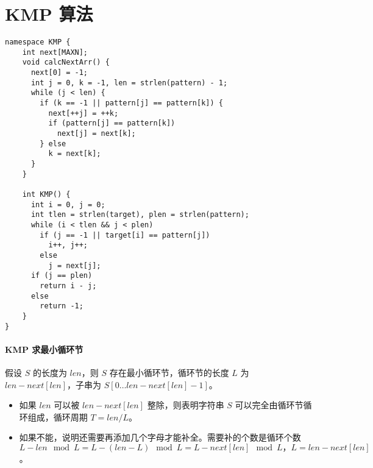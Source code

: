 \section{KMP 算法}
\begin{verbatim}
namespace KMP {
    int next[MAXN];
    void calcNextArr() {
      next[0] = -1;
      int j = 0, k = -1, len = strlen(pattern) - 1;
      while (j < len) {
        if (k == -1 || pattern[j] == pattern[k]) {
          next[++j] = ++k;
          if (pattern[j] == pattern[k])
            next[j] = next[k];
        } else
          k = next[k];
      }
    }

    int KMP() {
      int i = 0, j = 0;
      int tlen = strlen(target), plen = strlen(pattern);
      while (i < tlen && j < plen)
        if (j == -1 || target[i] == pattern[j])
          i++, j++;
        else
          j = next[j];  
      if (j == plen)
        return i - j;
      else
        return -1;
    }
}
\end{verbatim}

\paragraph{KMP 求最小循环节} 假设 $S$ 的长度为 $len$，则 $S$ 存在最小循环节，循环节的长度 $L$ 为 $len-next[len]$，子串为 $S[0…len-next[len]-1]$。
\begin{itemize}
  \item 如果 $len$ 可以被 $len - next[len]$ 整除，则表明字符串 $S$ 可以完全由循环节循环组成，循环周期 $T=len/L$。
  \item 如果不能，说明还需要再添加几个字母才能补全。需要补的个数是循环个数 $L-len \mod L=L-(len-L) \mod L=L-next[len] \mod L，L=len-next[len]$。
\end{itemize}
